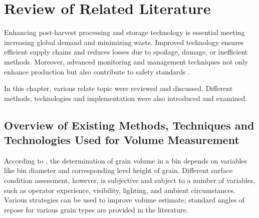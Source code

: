 \renewcommand{\thechapter}{\Roman{chapter}}
\chapter{Review of Related Literature}
\renewcommand{\thechapter}{\arabic{chapter}}
\label{ch:rrl}
\thispagestyle{empty}

Enhancing post-harvest processing and storage technology is essential meeting increasing global demand and minimizing waste. Improved technology ensures efficient supply chains and reduces losses due to spoilage, damage, or inefficient methods. Moreover, advanced monitoring and management techniques not only enhance production but also contribute to safety standards \citep{Kumar2017-jl,Joni2022}.

In this chapter, various relate topic were reviewed and discussed. Different methods, technologies and implementation were also introduced and examined.

\section{Overview of Existing Methods, Techniques and Technologies Used for Volume Measurement}

According to \citet{turner2016}, the determination of grain volume in a bin depends on variables like bin diameter and corresponding level height of grain. Different surface condition assessment, however, is subjective and subject to a number of variables, such as operator experience, visibility, lighting, and ambient circumstances. Various strategies can be used to improve volume estimate; standard angles of repose for various grain types are provided in the literature.

